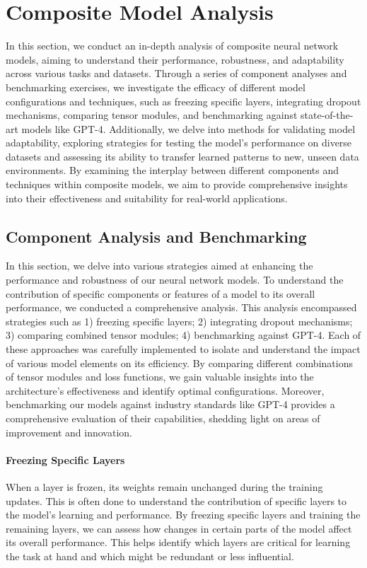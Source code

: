 \section{Composite Model Analysis}
\label{sec:4_composite_model_analysis}
In this section, we conduct an in-depth analysis of composite neural network models, aiming to understand their performance, robustness, and adaptability across various tasks and datasets. Through a series of component analyses and benchmarking exercises, we investigate the efficacy of different model configurations and techniques, such as freezing specific layers, integrating dropout mechanisms, comparing tensor modules, and benchmarking against state-of-the-art models like GPT-4. Additionally, we delve into methods for validating model adaptability, exploring strategies for testing the model's performance on diverse datasets and assessing its ability to transfer learned patterns to new, unseen data environments. By examining the interplay between different components and techniques within composite models, we aim to provide comprehensive insights into their effectiveness and suitability for real-world applications.

\subsection{Component Analysis and Benchmarking}
\label{subsec:4_component_analysis_and_benchmarking}
In this section, we delve into various strategies aimed at enhancing the performance and robustness of our neural network models. To understand the contribution of specific components or features of a model to its overall performance, we conducted a comprehensive analysis. This analysis encompassed strategies such as 1) freezing specific layers; 2) integrating dropout mechanisms; 3) comparing combined tensor modules; 4) benchmarking against GPT-4. Each of these approaches was carefully implemented to isolate and understand the impact of various model elements on its efficiency. By comparing different combinations of tensor modules and loss functions, we gain valuable insights into the architecture's effectiveness and identify optimal configurations. Moreover, benchmarking our models against industry standards like GPT-4 provides a comprehensive evaluation of their capabilities, shedding light on areas of improvement and innovation.

\paragraph*{Freezing Specific Layers}
\label{par:4_freezing_specific_layers}
When a layer is frozen, its weights remain unchanged during the training updates. This is often done to understand the contribution of specific layers to the model's learning and performance. By freezing specific layers and training the remaining layers, we can assess how changes in certain parts of the model affect its overall performance. This helps identify which layers are critical for learning the task at hand and which might be redundant or less influential.

